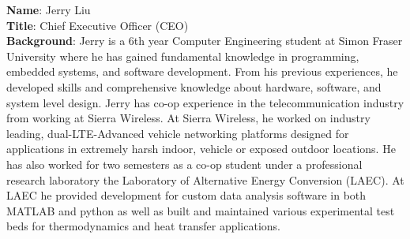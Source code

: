 \bigskip
\bigskip
\textbf{Name}: Jerry Liu \\
\medskip
\textbf{Title}: Chief Executive Officer (CEO) \\
\medskip
\textbf{Background}: Jerry is a 6th year Computer Engineering student at Simon Fraser University where he has gained fundamental knowledge in programming, embedded systems, and  software development. From his previous experiences, he developed skills and comprehensive knowledge about hardware, software, and system level design. Jerry has co-op experience in the telecommunication industry from working at Sierra Wireless. At Sierra Wireless, he worked on industry leading, dual-LTE-Advanced vehicle networking platforms designed for applications in extremely harsh indoor, vehicle or exposed outdoor locations. He has also worked for two semesters as a co-op student under a professional research laboratory the Laboratory of Alternative Energy Conversion (LAEC). At LAEC he provided development for custom data analysis software in both MATLAB and python as well as built and maintained various experimental test beds for thermodynamics and heat transfer applications.

